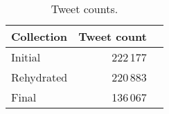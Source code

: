 \begin{table}[h]
  \centering
  \begin{tabular}{lrr}
    \toprule
    Collection & Tweet count \\
    \midrule
    Initial    & 222\,177    \\
    Rehydrated & 220\,883    \\
    Final      & 136\,067    \\
    \bottomrule
  \end{tabular}
  \caption{Tweet counts.}
  \label{tab:tweet-counts}
\end{table}